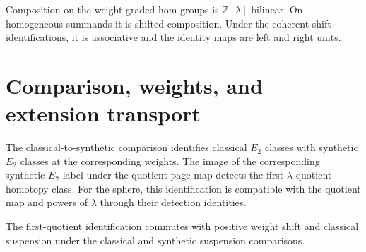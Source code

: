 \begin{theorem}
\label{sem:AdamsSynthetic:graded-composition}
Composition on the weight-graded hom groups is $\mathbb Z[\lambda]$-bilinear. On homogeneous summands it is shifted composition. Under the coherent shift identifications, it is associative and the identity maps are left and right units.
\end{theorem}

\section{Comparison, weights, and extension transport}

\begin{definition}
\label{sem:AdamsSynthetic:e2-comparison}
The classical-to-synthetic comparison identifies classical $E_2$ classes with synthetic $E_2$ classes at the corresponding weights. The image of the corresponding synthetic $E_2$ label under the quotient page map detects the first $\lambda$-quotient homotopy class. For the sphere, this identification is compatible with the quotient map and powers of $\lambda$ through their detection identities.
\end{definition}

\begin{theorem}
\label{sem:AdamsSynthetic:first-quotient-shifts}
The first-quotient identification commutes with positive weight shift and classical suspension under the classical and synthetic suspension comparisons.
\end{theorem}

